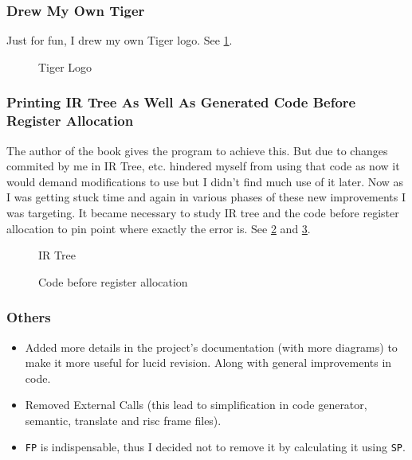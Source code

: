 \subsubsection{Drew My Own Tiger}

Just for fun, I drew my own Tiger logo. See \ref{fig:tig}.

\begin{figure}
\centering
{}
\caption{Tiger Logo}
\label{fig:tig}
\end{figure}

\subsubsection{Printing IR Tree As Well As Generated Code Before Register Allocation}

The author of the book gives the program to achieve this. But due to changes commited by me in IR Tree, etc. hindered myself from using that code as now it would demand modifications to use but I didn't find much use of it later. Now as I was getting stuck time and again in various phases of these new improvements I was targeting. It became necessary to study IR tree and the code before register allocation to pin point where exactly the error is. See \ref{fig:ir} and \ref{fig:ba}.

\begin{figure}
\centering
{}
\caption{IR Tree}
\label{fig:ir}
\end{figure}


\begin{figure}
\centering
{}
\caption{Code before register allocation}
\label{fig:ba}
\end{figure}

\subsubsection{Others}

\begin{itemize}
  \item Added more details in the project’s documentation (with more diagrams) to make it more useful for lucid revision. Along with general improvements in code.
  \item Removed External Calls (this lead to simplification in code generator, semantic, translate and risc frame files).
  \item \texttt{FP} is indispensable, thus I decided not to remove it by calculating it using \texttt{SP}.
\end{itemize}

